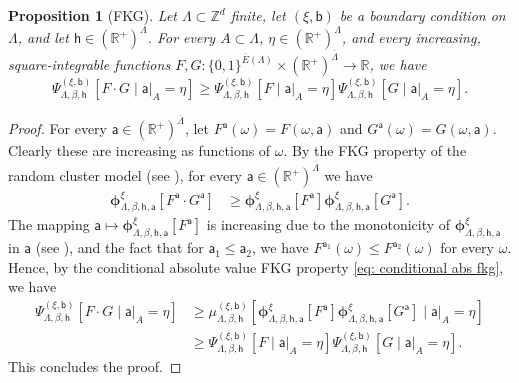 \documentclass[11pt,a4paper]{article}
\newtheorem{proposition}[theorem]{Proposition}
\theoremstyle{definition}
\numberwithin{equation}{section}
\begin{document}
\begin{proposition}[FKG]\label{prop:FKG random cluster}
Let $\Lambda\subset \mathbb{Z}^d$ finite, let $(\xi,\mathsf{b})$ be a boundary condition on $\Lambda$, and let $\mathsf h\in (\mathbb{R}^+)^{\Lambda}$. For every $A \subset \Lambda$, $\eta \in (\mathbb R^+)^\Lambda$, and every increasing, square-integrable functions $F,G: \{0,1\}^{\overline{E}(\Lambda)}\times (\mathbb R^+)^{\overline{\Lambda}}\to\mathbb{R}$,
we have
\begin{equation}
\Psi_{\Lambda,\beta,\mathsf{h}}^{(\xi,\mathsf{b})}[F\cdot G \mid \mathsf a|_A=\eta]
\geq
\Psi_{\Lambda,\beta,\mathsf{h}}^{(\xi,\mathsf{b})}[F \mid \mathsf a|_A=\eta] \Psi_{\Lambda,\beta,\mathsf{h}}^{(\xi,\mathsf{b})}[G \mid \mathsf a|_A=\eta].
\end{equation}
\end{proposition}

\begin{proof}
For every $\mathsf{a} \in (\mathbb{R}^+)^{\overline{\Lambda}}$, let $F^{\mathsf{a}}(\omega)= F(\omega,\mathsf{a})$ and $G^{\mathsf{a}}(\omega)=G(\omega,\mathsf{a})$. Clearly these are increasing as functions of $\omega$.
By the FKG property of the random cluster model (see \cite[Theorem 3.8]{Grimmett2006RCM}), for every $\mathsf{a} \in (\mathbb{R}^+)^{\overline{\Lambda}}$ we have
\begin{align}
\boldsymbol{\phi}^\xi_{\Lambda,\beta,\mathsf h,\mathsf{a}}[F^{\mathsf{a}} \cdot G^{\mathsf{a}}]
&\geq
\boldsymbol{\phi}^\xi_{\Lambda,\beta,\mathsf h,\mathsf{a}}[F^{\mathsf{a}}]\boldsymbol{\phi}^\xi_{\Lambda,\beta,\mathsf h,\mathsf{a}}[G^{\mathsf{a}}].
\end{align}
The mapping $\mathsf{a} \mapsto \boldsymbol{\phi}^\xi_{\Lambda,\beta,\mathsf{h},\mathsf{a}}[F^{\mathsf{a}}]$ is increasing due to the monotonicity of $\boldsymbol{\phi}^\xi_{\Lambda,\beta,\mathsf{h},\mathsf{a}}$ in $\mathsf{a}$ (see \cite[Theorem 3.21]{Grimmett2006RCM}), and the fact that for $\mathsf a_1 \leq \mathsf a_2$, we have $F^{\mathsf{a}_1}(\omega) \leq F^{\mathsf{a}_2}(\omega)$ for every $\omega$. Hence, by the conditional absolute value FKG property \eqref{eq: conditional abs fkg}, we have
\begin{equation}
\begin{aligned}
\Psi_{\Lambda,\beta,\mathsf{h}}^{(\xi,\mathsf{b})}[F\cdot G \mid \mathsf a|_A=\eta]
&\geq
\mu_{\Lambda,\beta,\mathsf{h}}^{(\xi,\mathsf{b})}[\boldsymbol{\phi}^\xi_{\Lambda,\beta,\mathsf{h},\mathsf{a}}[F^{\mathsf{a}}]\boldsymbol{\phi}^\xi_{\Lambda,\beta,\mathsf{h},\mathsf{a}}[G^{\mathsf{a}}] \mid \mathsf a|_A=\eta]
\\
&\geq
\Psi_{\Lambda,\beta,\mathsf{h}}^{(\xi,\mathsf{b})}[F \mid \mathsf a|_A=\eta]\Psi_{\Lambda,\beta,\mathsf{h}}^{(\xi,\mathsf{b})}[G \mid \mathsf a|_A=\eta].
\end{aligned}
\end{equation}
This concludes the proof.
\end{proof}
\end{document}
